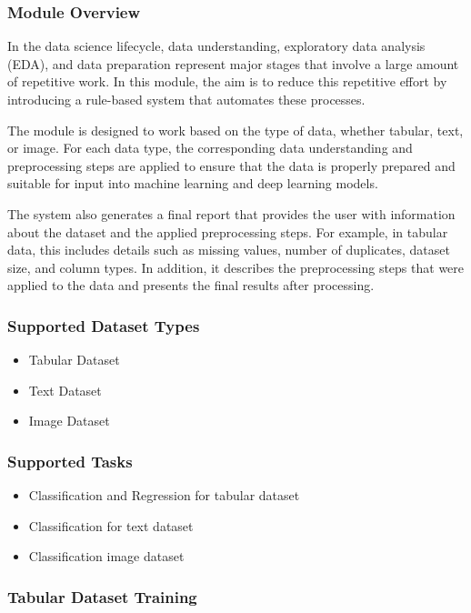 \subsubsection{Module Overview}

In the data science lifecycle, data understanding, exploratory data analysis (EDA), and data preparation represent major stages that involve a large amount of repetitive work. In this module, the aim is to reduce this repetitive effort by introducing a rule-based system that automates these processes.

The module is designed to work based on the type of data, whether tabular, text, or image. For each data type, the corresponding data understanding and preprocessing steps are applied to ensure that the data is properly prepared and suitable for input into machine learning and deep learning models.

The system also generates a final report that provides the user with information about the dataset and the applied preprocessing steps. For example, in tabular data, this includes details such as missing values, number of duplicates, dataset size, and column types. In addition, it describes the preprocessing steps that were applied to the data and presents the final results after processing.
\subsubsection{Supported Dataset Types}
\begin{itemize}
  \item Tabular Dataset
  \item Text Dataset
  \item Image Dataset
\end{itemize}
\subsubsection{Supported Tasks }

\begin{itemize}
  \item Classification and Regression for tabular dataset
  \item Classification for text dataset
  \item Classification image dataset
\end{itemize}


\subsubsection{Tabular Dataset Training}

